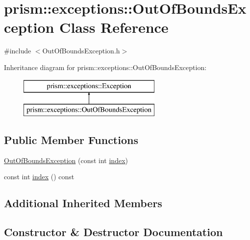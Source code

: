 \hypertarget{classprism_1_1exceptions_1_1_out_of_bounds_exception}{}\section{prism\+:\+:exceptions\+:\+:Out\+Of\+Bounds\+Exception Class Reference}
\label{classprism_1_1exceptions_1_1_out_of_bounds_exception}


{\ttfamily \#include $<$Out\+Of\+Bounds\+Exception.\+h$>$}

Inheritance diagram for prism\+:\+:exceptions\+:\+:Out\+Of\+Bounds\+Exception\+:\begin{figure}[H]
\begin{center}
\leavevmode
\includegraphics[height=2.000000cm]{classprism_1_1exceptions_1_1_out_of_bounds_exception}
\end{center}
\end{figure}
\subsection*{Public Member Functions}
\begin{DoxyCompactItemize}
\item 
\hyperlink{classprism_1_1exceptions_1_1_out_of_bounds_exception_a91f4a113122f0d73830b8b06b94c8e4d}{Out\+Of\+Bounds\+Exception} (const int \hyperlink{classprism_1_1exceptions_1_1_out_of_bounds_exception_a5b08f4559b6f0551adfa37088b025b39}{index})
\item 
const int \hyperlink{classprism_1_1exceptions_1_1_out_of_bounds_exception_a5b08f4559b6f0551adfa37088b025b39}{index} () const 
\end{DoxyCompactItemize}
\subsection*{Additional Inherited Members}


\subsection{Constructor \& Destructor Documentation}
